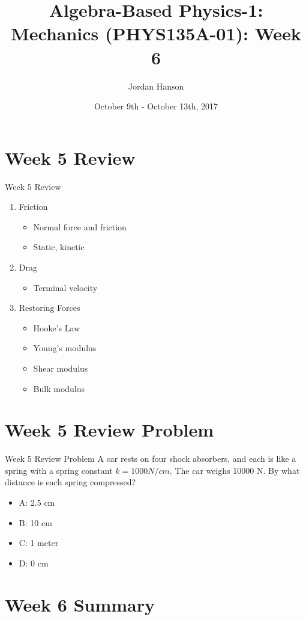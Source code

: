 \documentclass{beamer}
\title{Algebra-Based Physics-1: Mechanics (PHYS135A-01): Week 6}
\date{October 9th - October 13th, 2017}
\author{Jordan Hanson}
\institute{Whittier College Department of Physics and Astronomy}
\begin{document}
\maketitle

\section{Week 5 Review}

\begin{frame}{Week 5 Review}
\begin{enumerate}
\item \alert{Friction}
\begin{itemize}
\item Normal force and friction
\item Static, kinetic
\end{itemize}
\item \alert{Drag}
\begin{itemize}
\item Terminal velocity
\end{itemize}
\item \alert{Restoring Forces}
\begin{itemize}
\item Hooke's Law
\item Young's modulus
\item Shear modulus
\item Bulk modulus
\end{itemize}
\end{enumerate}
\end{frame}

\section{Week 5 Review Problem}

\begin{frame}{Week 5 Review Problem}
A car rests on four shock absorbers, and each is like a spring with a spring constant $k = 1000 N/cm$.  The car weighs 10000 N.  By what distance is each spring compressed?
\begin{itemize}
\item A: 2.5 cm
\item B: 10 cm
\item C: 1 meter
\item D: 0 cm
\end{itemize}
\end{frame}

\section{Week 6 Summary}
\end{document}
